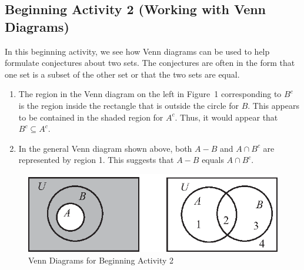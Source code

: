 \documentclass[11pt]{article}
\begin{document}
\subsection*{Beginning Activity 2 (Working with Venn Diagrams)}
In this beginning activity, we see how Venn diagrams can be used to help formulate conjectures about two sets.  The conjectures are often in the form that one set is a subset of the other set or that the two sets are equal.
\begin{enumerate} 
\item The region in the Venn diagram on the left in Figure~1 corresponding to  $B^c $  is the region inside the rectangle that is outside the circle for  $B$.  This appears to be contained in the shaded region for  $A^c $.  Thus, it would appear that  $B^c  \subseteq A^c $.
\item In the general Venn diagram shown above, both  $A - B$
  and  $A \cap B^c $ are represented by region 1.  This suggests that  $A - B$  equals  
$A \cap B^c $.
\end{enumerate}
\vspace{-108pt}
\begin{figure}[h]
\begin{center}
\includegraphics{figps-prev52.eps}
\caption{Venn Diagrams for Beginning Activity 2} \notag
\end{center}
\end{figure}

\hbreak
\end{document}
